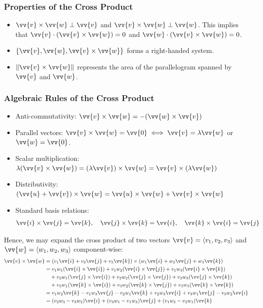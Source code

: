 \subsubsection{Properties of the Cross Product}
\begin{itemize}
    \item $\vv{v} \times \vv{w} \perp \vv{v}$ and $\vv{v} \times \vv{w} \perp \vv{w}$. This implies that $\vv{v} \cdot (\vv{v} \times \vv{w}) = 0$ and $\vv{w} \cdot (\vv{v} \times \vv{w}) = 0$.
    \item $\{\vv{v}, \vv{w}, \vv{v} \times \vv{w}\}$ forms a right-handed system.
    \item $\norm{\vv{v} \times \vv{w}}$ represents the area of the parallelogram spanned by $\vv{v}$ and $\vv{w}$.
\end{itemize}

\subsubsection{Algebraic Rules of the Cross Product}
\begin{itemize}
    \item Anti-commutativity: $\vv{v} \times \vv{w} = -(\vv{w} \times \vv{v})$
    \item Parallel vectors: $\vv{v} \times \vv{w} = \vv{0} \iff \vv{v} = \lambda \vv{w}$ or $\vv{w} = \vv{0}$.
    \item Scalar multiplication: $\lambda (\vv{v} \times \vv{w}) = (\lambda \vv{v}) \times \vv{w} = \vv{v} \times (\lambda \vv{w})$
    \item Distributivity: $(\vv{u} + \vv{v}) \times \vv{w} = \vv{u} \times \vv{w} + \vv{v} \times \vv{w}$
    \item Standard basis relations:
    \[
    \vv{i} \times \vv{j} = \vv{k}, \quad \vv{j} \times \vv{k} = \vv{i}, \quad \vv{k} \times \vv{i} = \vv{j}
    \]
\end{itemize}

Hence, we may expand the cross product of two vectors $\vv{v} = \ang{v_1, v_2, v_3}$ and $\vv{w} = \ang{w_1, w_2, w_3}$ component-wise:
\begin{align*}
\vv{v} \times \vv{w} &= (v_1 \vv{i} + v_2 \vv{j} + v_3 \vv{k}) \times (w_1 \vv{i} + w_2 \vv{j} + w_3 \vv{k}) \\
                     &= v_1 w_1 (\vv{i} \times \vv{i}) + v_1 w_2 (\vv{i} \times \vv{j}) + v_1 w_3 (\vv{i} \times \vv{k}) \\
                     &\quad + v_2 w_1 (\vv{j} \times \vv{i}) + v_2 w_2 (\vv{j} \times \vv{j}) + v_2 w_3 (\vv{j} \times \vv{k}) \\
                     &\quad + v_3 w_1 (\vv{k} \times \vv{i}) + v_3 w_2 (\vv{k} \times \vv{j}) + v_3 w_3 (\vv{k} \times \vv{k}) \\
                     &= v_1 w_2 \vv{k} - v_1 w_3 \vv{j} - v_2 w_1 \vv{k} + v_2 w_3 \vv{i} + v_3 w_1 \vv{j} - v_3 w_2 \vv{i} \\
                     &= (v_2 w_3 - v_3 w_2) \vv{i} + (v_3 w_1 - v_1 w_3) \vv{j} + (v_1 w_2 - v_2 w_1) \vv{k}
\end{align*}

